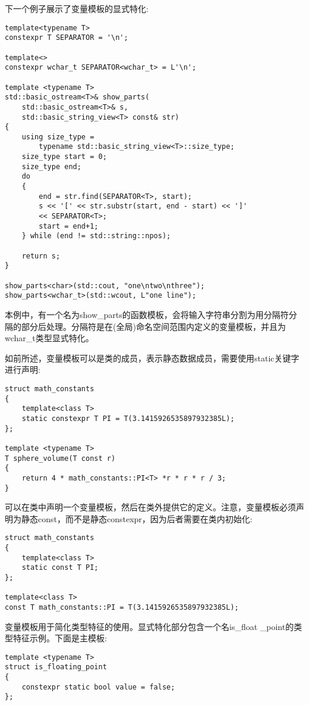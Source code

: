 下一个例子展示了变量模板的显式特化:

\begin{lstlisting}[style=styleCXX]
template<typename T>
constexpr T SEPARATOR = '\n';

template<>
constexpr wchar_t SEPARATOR<wchar_t> = L'\n';

template <typename T>
std::basic_ostream<T>& show_parts(
	std::basic_ostream<T>& s,
	std::basic_string_view<T> const& str)
{
	using size_type =
		typename std::basic_string_view<T>::size_type;
	size_type start = 0;
	size_type end;
	do
	{
		end = str.find(SEPARATOR<T>, start);
		s << '[' << str.substr(start, end - start) << ']'
		<< SEPARATOR<T>;
		start = end+1;
	} while (end != std::string::npos);

	return s;
}

show_parts<char>(std::cout, "one\ntwo\nthree");
show_parts<wchar_t>(std::wcout, L"one line");
\end{lstlisting}

本例中，有一个名为show\_parts的函数模板，会将输入字符串分割为用分隔符分隔的部分后处理。分隔符是在(全局)命名空间范围内定义的变量模板，并且为wchar\_t类型显式特化。

如前所述，变量模板可以是类的成员，表示静态数据成员，需要使用static关键字进行声明:

\begin{lstlisting}[style=styleCXX]
struct math_constants
{
	template<class T>
	static constexpr T PI = T(3.1415926535897932385L);
};

template <typename T>
T sphere_volume(T const r)
{
	return 4 * math_constants::PI<T> *r * r * r / 3;
}
\end{lstlisting}

可以在类中声明一个变量模板，然后在类外提供它的定义。注意，变量模板必须声明为静态const，而不是静态constexpr，因为后者需要在类内初始化:

\begin{lstlisting}[style=styleCXX]
struct math_constants
{
	template<class T>
	static const T PI;
};

template<class T>
const T math_constants::PI = T(3.1415926535897932385L);
\end{lstlisting}

变量模板用于简化类型特征的使用。显式特化部分包含一个名is\_float \_point的类型特征示例。下面是主模板:

\begin{lstlisting}[style=styleCXX]
template <typename T>
struct is_floating_point
{
	constexpr static bool value = false;
};
\end{lstlisting}

